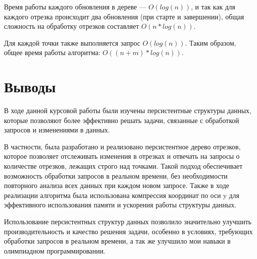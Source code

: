 \documentclass[12pt]{article}
\begin{document}
Время работы каждого обновления в дереве — $O(log(n))$, и так как для каждого отрезка происходит два обновления (при старте и завершении), общая сложность на обработку отрезков составляет $O(n*log(n))$.

Для каждой точки также выполняется запрос $O(log(n))$. Таким образом, общее время работы алгоритма: $O((n + m)*log(n))$.

\newpage
\section*{Выводы}

В ходе данной курсовой работы были изучены персистентные структуры данных, которые позволяют более эффективно решать задачи, связанные с обработкой запросов и изменениями в данных. 

В частности, была разработано и реализовано персистентное дерево отрезков, которое позволяет отслеживать изменения в отрезках и отвечать на запросы о количестве отрезков, лежащих строго над точками. Такой подход обеспечивает возможность обработки запросов в реальном времени, без необходимости повторного анализа всех данных при каждом новом запросе. Также в ходе реализации алгоритма была использована компрессия координат по оси y для эффективного использования памяти и ускорения работы структуры данных.

Использование персистентных структур данных позволило значительно улучшить производительность и качество решения задачи, особенно в условиях, требующих обработки запросов в реальном времени, а так же улучшило мои навыки в олимпиадном программировании.
\end{document}
